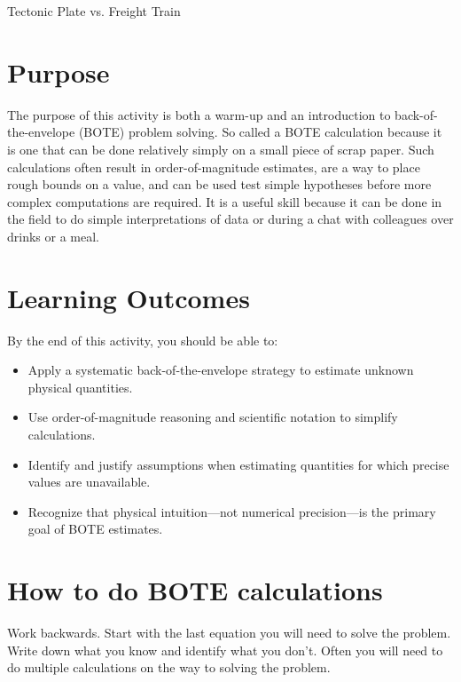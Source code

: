 \begin{activity}{Tectonic Plate vs. Freight Train}

\section*{Purpose}

The purpose of this activity is both a warm-up and an introduction to back-of-the-envelope (BOTE) problem solving.  So called a BOTE calculation because it is one that can be done relatively simply on a small piece of scrap paper.  Such calculations often result in order-of-magnitude estimates, are a way to place rough bounds on a value, and can be used test simple hypotheses before more complex computations are required.  It is a useful skill because it can be done in the field to do simple interpretations of data or during a chat with colleagues over drinks or a meal.

\section*{Learning Outcomes}

By the end of this activity, you should be able to:
\begin{itemize}
  \item Apply a systematic back-of-the-envelope strategy to estimate unknown physical quantities.
  \item Use order-of-magnitude reasoning and scientific notation to simplify calculations.
  \item Identify and justify assumptions when estimating quantities for which precise values are unavailable.
  \item Recognize that physical intuition---not numerical precision---is the primary goal of BOTE estimates.
\end{itemize}

\section*{How to do BOTE calculations}

Work backwards.  Start with the last equation you will need to solve the problem.  Write down what you know and identify what you don't.  Often you will need to do multiple calculations on the way to solving the problem.


\end{activity}
